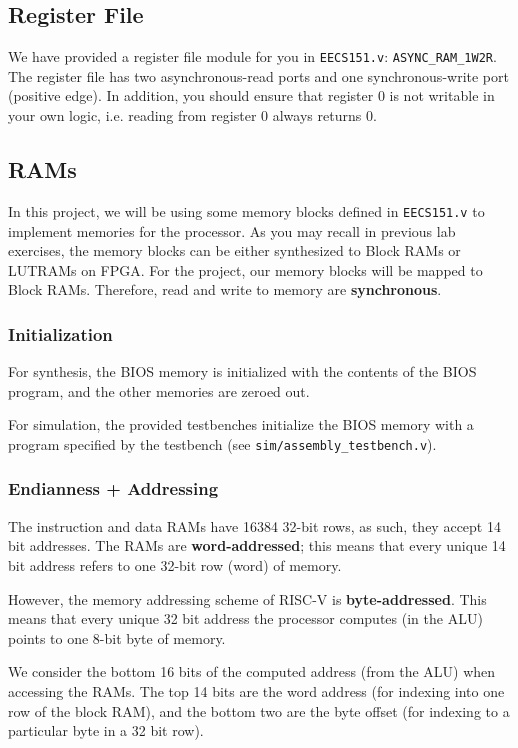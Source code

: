 \documentclass[11pt]{article}
\begin{document}
\subsection{Register File}
\label{reg_file}
We have provided a register file module for you in \verb|EECS151.v|: \verb|ASYNC_RAM_1W2R|. The register file has two asynchronous-read ports and one synchronous-write port (positive edge). In addition, you should ensure that register 0 is not writable in your own logic, i.e. reading from register 0 always returns 0.

\subsection{RAMs}
\label{ram_info}
In this project, we will be using some memory blocks defined in \verb|EECS151.v| to implement memories for the processor.
As you may recall in previous lab exercises, the memory blocks can be either synthesized to Block RAMs or LUTRAMs on FPGA.
For the project, our memory blocks will be mapped to Block RAMs. Therefore, read and write to memory are \textbf{synchronous}.

\subsubsection{Initialization}

For synthesis, the BIOS memory is initialized with the contents of the BIOS program, and the other memories are zeroed out.

For simulation, the provided testbenches initialize the BIOS memory with a program specified by the testbench (see \verb|sim/assembly_testbench.v|).

\subsubsection{Endianness + Addressing}
The instruction and data RAMs have 16384 32-bit rows, as such, they accept 14 bit addresses.
The RAMs are \textbf{word-addressed}; this means that every unique 14 bit address refers to one 32-bit row (word) of memory.

However, the memory addressing scheme of RISC-V is \textbf{byte-addressed}.
This means that every unique 32 bit address the processor computes (in the ALU) points to one 8-bit byte of memory.

We consider the bottom 16 bits of the computed address (from the ALU) when accessing the RAMs.
The top 14 bits are the word address (for indexing into one row of the block RAM), and the bottom two are the byte offset (for indexing to a particular byte in a 32 bit row).
\end{document}
